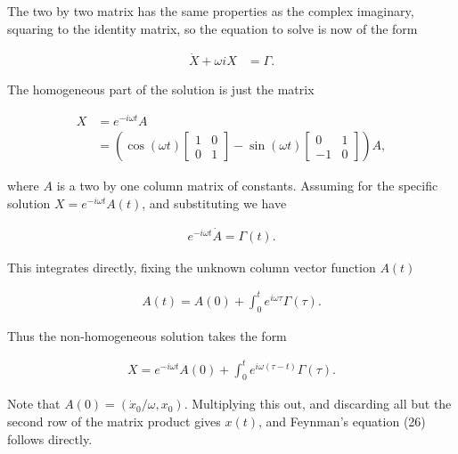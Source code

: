 The two by two matrix has the same properties as the complex imaginary, squaring to the identity matrix, so the equation to solve is now of the form

\begin{align}\label{eqn:1dharmonicOsc:5}
\dot{X} + \omega i X &= \Gamma.
\end{align}

The homogeneous part of the solution is just the matrix

\begin{align*}
X 
&= e^{-i \omega t} A \\
&= 
\left( 
\cos(\omega t) 
\begin{bmatrix}
1 & 0 \\
0 & 1
\end{bmatrix}
- 
\sin(\omega t)
\begin{bmatrix}
0 & 1 \\
-1 & 0
\end{bmatrix}
\right) A,
\end{align*}

where $A$ is a two by one column matrix of constants.  Assuming for the specific solution $X = e^{-i \omega t} A(t)$, and substituting we have

\begin{align}\label{eqn:1dharmonicOsc:6}
e^{-i \omega t} \dot{A} = \Gamma(t).
\end{align}

This integrates directly, fixing the unknown column vector function $A(t)$

\begin{align}\label{eqn:1dharmonicOsc:7}
A(t) = A(0) + \int_0^t e^{i \omega \tau} \Gamma(\tau).
\end{align}

Thus the non-homogeneous solution takes the form

\begin{align}\label{eqn:1dharmonicOsc:8}
X = e^{-i \omega t} A(0) + \int_0^t e^{i \omega (\tau - t)} \Gamma(\tau).
\end{align}

Note that $A(0) = (\dot{x}_0/\omega, x_0)$.  Multiplying this out, and discarding all but the second row of the matrix product gives $x(t)$, and Feynman's equation (26) follows directly.

\EndArticle
